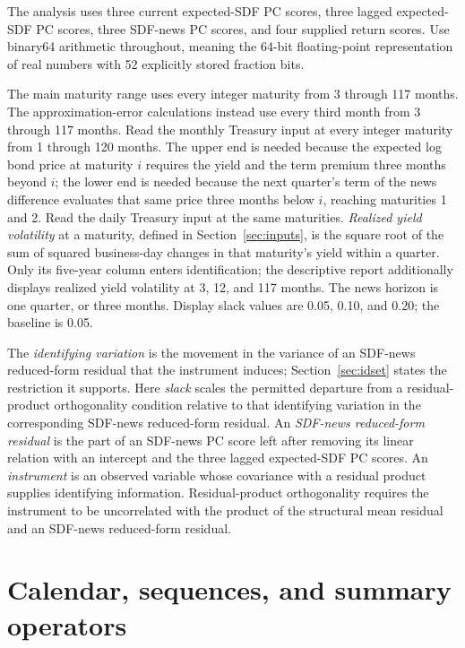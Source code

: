 \documentclass[11pt]{article}
\begin{document}
The analysis uses three current expected-SDF PC scores, three lagged expected-SDF
PC scores, three SDF-news PC scores, and four supplied return scores.
Use binary64 arithmetic throughout, meaning the 64-bit floating-point representation of real
numbers with 52 explicitly stored fraction bits.

The main maturity range uses every integer maturity from 3 through 117 months. The
approximation-error calculations instead use every third month from 3 through 117 months. Read the monthly Treasury
input at every integer maturity from 1 through 120 months. The upper end is needed because the
expected log bond price at maturity \(i\) requires the yield and the term premium three months beyond
\(i\); the lower end is needed because the next quarter's term of the news difference evaluates that
same price three months below \(i\), reaching maturities 1 and 2. Read the daily Treasury input at the
same maturities. \emph{Realized yield volatility} at a maturity, defined in Section~\ref{sec:inputs}, is the square
root of the sum of squared business-day changes in that maturity's yield within a quarter. Only its five-year column enters identification; the descriptive report
additionally displays realized yield volatility at 3, 12, and 117 months.
The news horizon is
one quarter, or three months. Display slack values are 0.05, 0.10, and 0.20; the baseline is 0.05.

The \emph{identifying variation} is the movement in the variance of an SDF-news reduced-form residual
that the instrument induces; Section~\ref{sec:idset} states the restriction it supports. Here
\emph{slack} scales the permitted departure from a residual-product orthogonality condition
relative to that identifying variation in the corresponding SDF-news reduced-form residual. An
\emph{SDF-news reduced-form residual} is the part of an SDF-news PC score left after removing its
linear relation with an intercept and the three lagged expected-SDF PC scores. An \emph{instrument}
is an observed variable whose covariance with a residual product supplies identifying information.
Residual-product orthogonality requires the instrument to be uncorrelated with the
product of the structural mean residual and an SDF-news reduced-form residual.

\section{Calendar, sequences, and summary operators}
\label{sec:calendar}
\end{document}
